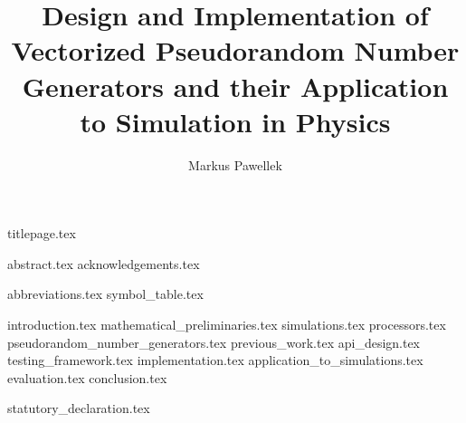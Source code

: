 \documentclass[fleqn,10pt,twoside]{stdglobal}
\title{Design and Implementation of Vectorized Pseudorandom Number Generators and their Application to Simulation in Physics}
\author{Markus Pawellek}
\let\oldpagenumbering\pagenumbering
\renewcommand*\pagenumbering[1]{\cleardoublepage\oldpagenumbering{#1}}
\begin{document}

  {titlepage.tex}

  {abstract.tex}
  {acknowledgements.tex}

  \tableofcontents
  \listoffigures
  \listofmath
  {abbreviations.tex}
  {symbol_table.tex}

  {introduction.tex}
  {mathematical_preliminaries.tex}
  {simulations.tex}
  {processors.tex}
  {pseudorandom_number_generators.tex}
  {previous_work.tex}
  {api_design.tex}
  {testing_framework.tex}
  {implementation.tex}
  {application_to_simulations.tex}
  {evaluation.tex}
  {conclusion.tex}
  \printbibliography[heading=bibintoc]


  {statutory_declaration.tex}
\end{document}
